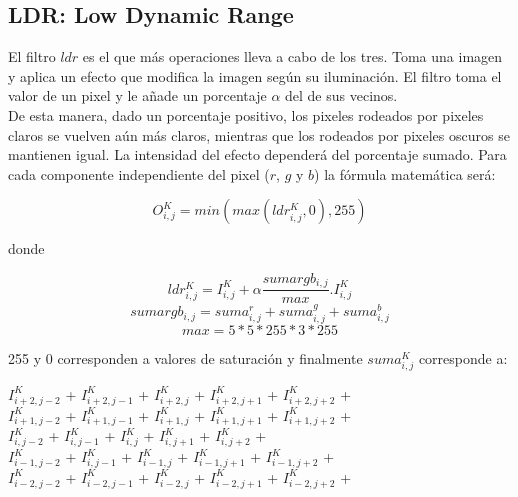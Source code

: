 \subsection{LDR: Low Dynamic Range}

El filtro $ldr$ es el que más operaciones lleva a cabo de los tres.
Toma una imagen y aplica un efecto que modifica la imagen según su iluminación. El filtro toma el valor de un pixel y le añade un porcentaje $\alpha$ del de sus vecinos.\\

De esta manera, dado un porcentaje positivo, los pixeles rodeados por pixeles claros se vuelven
aún más claros, mientras que los rodeados por pixeles oscuros se mantienen igual. La intensidad
del efecto dependerá del porcentaje sumado.
Para cada componente independiente del pixel ($r$, $g$ y $b$) la fórmula matemática será:

\begin{center}
$$O_{i,j}^{K} = min(max(ldr_{i,j}^{K},0),255)$$
\end{center}

donde

\begin{center}
$$ldr_{i,j}^{K} = I_{i,j}^{K} + \alpha \frac{sumargb_{i,j}}{max} . I_{i,j}^{K}$$
$$sumargb_{i,j} = suma_{i,j}^{r} + suma_{i,j}^{g} + suma_{i,j}^{b}$$
$$max = 5*5*255*3*255$$
\end{center}

255 y 0 corresponden a valores de saturación y finalmente $suma_{i,j}^{K}$ corresponde a:

\begin{center}
$I_{i+2,j-2}^{K}$ + $I_{i+2,j-1}^{K}$ + $I_{i+2,j}^{K}$ + $I_{i+2,j+1}^{K}$ + $I_{i+2,j+2}^{K}$ +\\
$I_{i+1,j-2}^{K}$ + $I_{i+1,j-1}^{K}$ + $I_{i+1,j}^{K}$ + $I_{i+1,j+1}^{K}$ + $I_{i+1,j+2}^{K}$ +\\
$I_{i,j-2}^{K}$ + $I_{i,j-1}^{K}$ + $I_{i,j}^{K}$ + $I_{i,j+1}^{K}$ + $I_{i,j+2}^{K}$ +\\
$I_{i-1,j-2}^{K}$ + $I_{i,j-1}^{K}$ + $I_{i-1,j}^{K}$ + $I_{i-1,j+1}^{K}$ + $I_{i-1,j+2}^{K}$ +\\ 
$I_{i-2,j-2}^{K}$ + $I_{i-2,j-1}^{K}$ + $I_{i-2,j}^{K}$ + $I_{i-2,j+1}^{K}$ + $I_{i-2,j+2}^{K}$ +\\
\end{center}

\newpage


